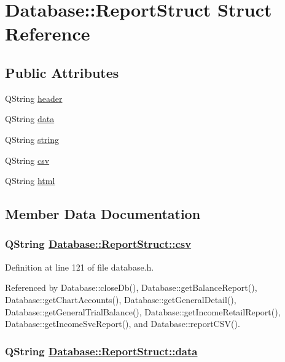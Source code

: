 \hypertarget{structDatabase_1_1ReportStruct}{
\section{Database::Report\-Struct Struct Reference}
\label{structDatabase_1_1ReportStruct}
}
\subsection*{Public Attributes}
\begin{CompactItemize}
\item 
QString \hyperlink{structDatabase_1_1ReportStruct_o0}{header}
\item 
QString \hyperlink{structDatabase_1_1ReportStruct_o1}{data}
\item 
QString \hyperlink{structDatabase_1_1ReportStruct_o2}{string}
\item 
QString \hyperlink{structDatabase_1_1ReportStruct_o3}{csv}
\item 
QString \hyperlink{structDatabase_1_1ReportStruct_o4}{html}
\end{CompactItemize}


\subsection{Member Data Documentation}
\hypertarget{structDatabase_1_1ReportStruct_o3}{
\subsubsection[csv]{\setlength{\rightskip}{0pt plus 5cm}QString \hyperlink{structDatabase_1_1ReportStruct_o3}{Database::Report\-Struct::csv}}}
\label{structDatabase_1_1ReportStruct_o3}


Definition at line 121 of file database.h.

Referenced by Database::close\-Db(), Database::get\-Balance\-Report(), Database::get\-Chart\-Accounts(), Database::get\-General\-Detail(), Database::get\-General\-Trial\-Balance(), Database::get\-Income\-Retail\-Report(), Database::get\-Income\-Svc\-Report(), and Database::report\-CSV().\hypertarget{structDatabase_1_1ReportStruct_o1}{
\subsubsection[data]{\setlength{\rightskip}{0pt plus 5cm}QString \hyperlink{structDatabase_1_1ReportStruct_o1}{Database::Report\-Struct::data}}}
\label{structDatabase_1_1ReportStruct_o1}


